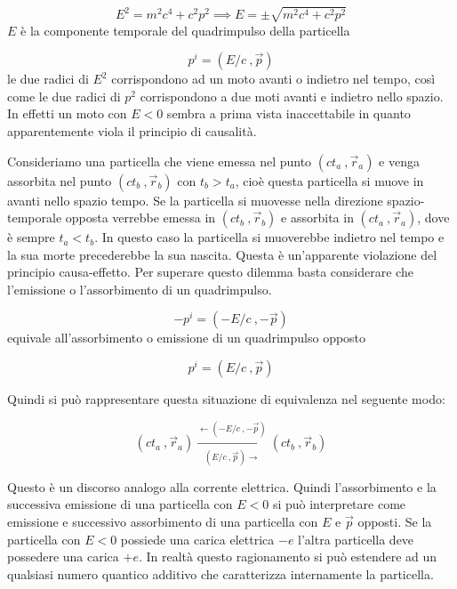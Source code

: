 \begin{equation*}
E^2 = m^2 c^4 + c^2 p^2 \implies E = \pm \sqrt{m^2 c^4 + c^2 p^2}
\end{equation*}
$E$ è la componente temporale del quadrimpulso della particella

\begin{equation*}
p^i = (E/c \ , \vec{p})
\end{equation*}
le due radici di $E^2$ corrispondono ad un moto avanti o indietro nel tempo,
così come le due radici di $p^2$ corrispondono a due moti avanti e indietro
nello spazio. In effetti un moto con $E < 0$ sembra a prima vista inaccettabile
in quanto apparentemente viola il principio di causalità.

Consideriamo una particella che viene emessa nel punto $(c t_a \ , \vec{r}_a)$ e
venga assorbita nel punto $(c t_b \ , \vec{r}_b )$ con $t_b > t_a$, cioè questa
particella si muove in avanti nello spazio tempo. Se la particella si muovesse
nella direzione spazio-temporale opposta verrebbe emessa in $(c t_b \ ,
\vec{r}_b)$ e assorbita in $(c t_a \ , \vec{r}_a)$, dove è sempre $t_a < t_b$.
In questo caso la particella si muoverebbe indietro nel tempo e la sua morte
precederebbe la sua nascita. Questa è un'apparente violazione del principio
causa-effetto. Per superare questo dilemma basta considerare che l'emissione o
l'assorbimento di un quadrimpulso.

\begin{equation*}
- p^i = (- E/c \ , - \vec{p})
\end{equation*}
equivale all'assorbimento o emissione di un quadrimpulso opposto

\begin{equation*}
p^i = ( E/c \ , \vec{p})
\end{equation*}

Quindi si può rappresentare questa situazione di equivalenza nel seguente modo:

\begin{equation*}
(c t_a \ , \vec{r}_a) \xrightarrow[(E/c \ , \vec{p}) \to ]{\gets (-E/c \ , - 
\vec{p})} (c t_b \ , \vec{r}_b)
\end{equation*}

Questo è un discorso analogo alla corrente elettrica. Quindi l'assorbimento e 
la
successiva emissione di una particella con $E < 0$ si può interpretare come
emissione e successivo assorbimento di una particella con $E$ e $\vec{p}$
opposti. Se la particella con $E < 0$ possiede una carica elettrica $-e$ l'altra
particella deve possedere una carica $+e$. In realtà questo ragionamento si 
può
estendere ad un qualsiasi numero quantico additivo che caratterizza internamente
la particella.

